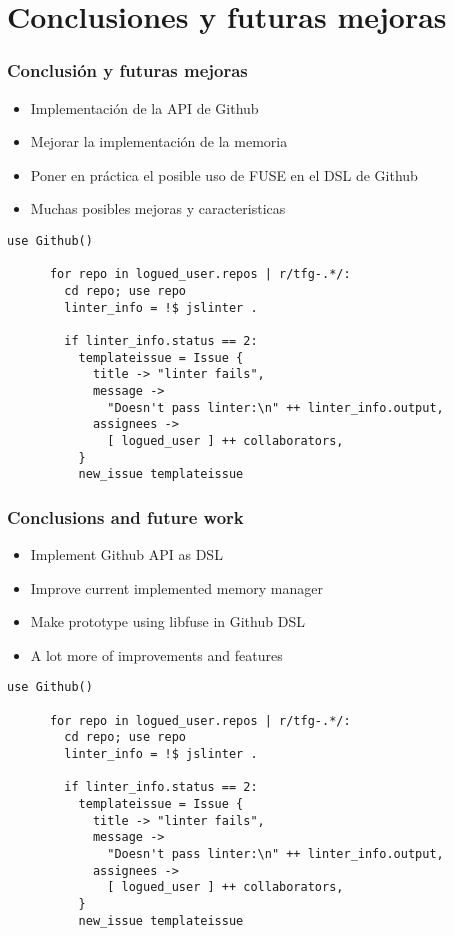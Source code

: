 \section{Conclusiones y futuras mejoras}
\begin{frame}
  \frametitle{Conclusión y futuras mejoras}
  \begin{center}
    \begin{itemize}
      \item Implementación de la API de Github
      \item Mejorar la implementación de la memoria
      \item Poner en práctica el posible uso de FUSE en el DSL de Github
      \item Muchas posibles mejoras y caracteristicas
    \end{itemize}
    \begin{lstlisting}[language=scriptflow2]
      use Github()

      for repo in logued_user.repos | r/tfg-.*/:
        cd repo; use repo
        linter_info = !$ jslinter .

        if linter_info.status == 2:
          templateissue = Issue {
            title -> "linter fails",
            message ->
              "Doesn't pass linter:\n" ++ linter_info.output,
            assignees ->
              [ logued_user ] ++ collaborators,
          }
          new_issue templateissue
    \end{lstlisting}
  \end{center}
\end{frame}

\begin{frame}
  \frametitle{Conclusions and future work}
  \begin{center}
    \begin{itemize}
      \item Implement Github API as DSL
      \item Improve current implemented memory manager
      \item Make prototype using libfuse in Github DSL
      \item A lot more of improvements and features
    \end{itemize}
    \begin{lstlisting}[language=scriptflow2]
      use Github()

      for repo in logued_user.repos | r/tfg-.*/:
        cd repo; use repo
        linter_info = !$ jslinter .

        if linter_info.status == 2:
          templateissue = Issue {
            title -> "linter fails",
            message ->
              "Doesn't pass linter:\n" ++ linter_info.output,
            assignees ->
              [ logued_user ] ++ collaborators,
          }
          new_issue templateissue
    \end{lstlisting}
  \end{center}

\end{frame}
